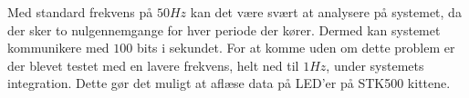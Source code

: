 Med standard frekvens på $50Hz$ kan det være svært at analysere på systemet, da der sker to nulgennemgange for hver periode der kører. Dermed kan systemet kommunikere med $100$ bits i sekundet. For at komme uden om dette problem er der blevet testet med en lavere frekvens, helt ned til $1Hz$, under systemets integration. Dette gør det muligt at aflæse data på LED'er på STK500 kittene.